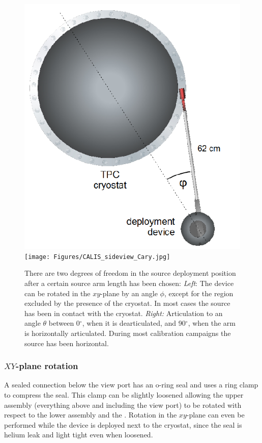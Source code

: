 \begin{figure}[htbp]
 \centering
  \includegraphics[height=0.35\textheight,clip=true]{Figures/DeploymentDevice_XY_view}
  \texttt{[image: Figures/CALIS\_sideview\_Cary.jpg]}
  \caption{There are two degrees of freedom in the source deployment position after a certain source arm length has been chosen: \textit{Left}: The device can be rotated in the $xy$-plane by an angle $\phi$, except for the region excluded by the presence of the cryostat. In most cases the source has been in contact with the cryostat. 
\textit{Right:} Articulation to an angle $\theta$ between 0$^{\circ}$, when it is dearticulated, and 90$^{\circ}$, when the arm is horizontally articulated. During most calibration campaigns the source has been horizontal.
  \label{fig:coordinate_system}}
\end{figure} 

\subsubsection*{$XY$-plane rotation}\label{sec:XYrotation}
A sealed connection below the view port has an o-ring seal and uses a ring clamp to compress the seal. This clamp can be slightly loosened allowing the upper assembly (everything above and including the view port) to be rotated with respect to the lower assembly and the \tpc. Rotation in the $xy$-plane can even be performed while the device is deployed next to the cryostat, since the seal is helium leak and light tight even when loosened.

